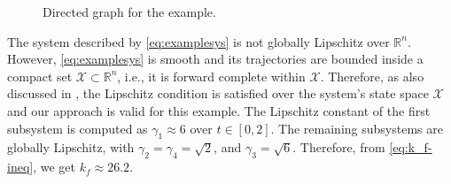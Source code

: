 \documentclass[journal]{IEEEtran}
\newcommand{\vertex}{\node[vertex]}
\begin{document}
\begin{figure}[!t]
    \centering
    \caption{Directed graph for the example.}
    \label{fig:ex-digraph}
\end{figure}

The system described by \eqref{eq:examplesys} is not globally Lipschitz over $\mathbb{R}^n$. 
However, \eqref{eq:examplesys} is smooth and its trajectories are bounded inside a compact set $\mathcal X\subset\mathbb R^n$, i.e., it is forward complete within $\mathcal X$. 
Therefore, as also discussed in \cite{Yuanqing22}, the Lipschitz condition is satisfied over the system's state space $\mathcal{X}$ and our approach is valid for this example. 
The Lipschitz constant of the first subsystem is computed as $\gamma_1 \approx 6$ over $t\in[0,2]$. The remaining subsystems are globally Lipschitz, with $\gamma_2 =\gamma_4 = \sqrt{2}$, and $\gamma_3 = \sqrt{6}$. Therefore, from \eqref{eq:k_f-ineq}, we get $k_f \approx 26.2$. 
\end{document}
